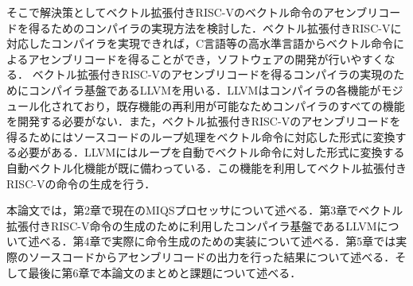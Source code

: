 そこで解決策としてベクトル拡張付きRISC-Vのベクトル命令のアセンブリコードを得るためのコンパイラの実現方法を検討した．ベクトル拡張付きRISC-Vに対応したコンパイラを実現できれば，C言語等の高水準言語からベクトル命令によるアセンブリコードを得ることができ，ソフトウェアの開発が行いやすくなる．
ベクトル拡張付きRISC-Vのアセンブリコードを得るコンパイラの実現のためにコンパイラ基盤であるLLVM\cite{bib:llvm}を用いる．LLVMはコンパイラの各機能がモジュール化されており，既存機能の再利用が可能なためコンパイラのすべての機能を開発する必要がない．また，ベクトル拡張付きRISC-Vのアセンブリコードを得るためにはソースコードのループ処理をベクトル命令に対応した形式に変換する必要がある．LLVMにはループを自動でベクトル命令に対した形式に変換する自動ベクトル化機能が既に備わっている．この機能を利用してベクトル拡張付きRISC-Vの命令の生成を行う．

本論文では，第2章で現在のMIQSプロセッサについて述べる．第3章でベクトル拡張付きRISC-V命令の生成のために利用したコンパイラ基盤であるLLVMについて述べる．第4章で実際に命令生成のための実装について述べる．第5章では実際のソースコードからアセンブリコードの出力を行った結果について述べる．そして最後に第6章で本論文のまとめと課題について述べる．
